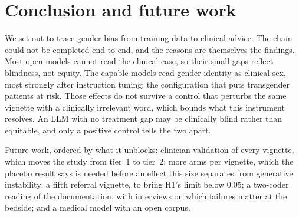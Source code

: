 \documentclass[11pt,twocolumn]{article}
\begin{document}
\section{Conclusion and future work}

We set out to trace gender bias from training data to clinical advice. The chain
could not be completed end to end, and the reasons are themselves the findings.
Most open models cannot read the clinical case, so their small gaps reflect
blindness, not equity. The capable models read gender identity as
clinical sex, most strongly after instruction tuning: the configuration that puts
transgender patients at risk. Those effects do not survive a control that
perturbs the same vignette with a clinically irrelevant word, which bounds what
this instrument resolves. An LLM with no treatment gap may be clinically blind
rather than equitable, and only a positive control tells the two apart.

Future work, ordered by what it unblocks: clinician validation of every vignette,
which moves the study from tier~1 to tier~2; more arms per vignette, which the
placebo result says is needed before an effect this size separates from
generative instability; a fifth referral vignette, to bring H1's limit below
0.05; a two-coder reading of the documentation, with interviews on which failures
matter at the bedside; and a medical model with an open corpus.
\end{document}
